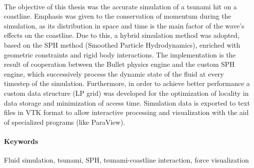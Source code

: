 \paragraph{} The objective of this thesis was the accurate simulation of a tsunami hit on
a coastline. Emphasis was given to the conservation of momentum during the simulation, as
its distribution in space and time is the main factor of the wave's effects on the
coastline. Due to this, a hybrid simulation method was adopted, based on the SPH method
(Smoothed Particle Hydrodynamics), enriched with geometric constraints and rigid body
interactions. The implementation is the result of cooperation between the Bullet physics
engine and the custom SPH engine, which successively process the dynamic state of the
fluid at every timestep of the simulation. Furthermore, in order to achieve better
performance a custom data structure (LP grid) was developed for the optimization of
locality in data storage and minimization of access time. Simulation data is exported to
text files in VTK format to allow interactive processing and visualization with the aid of
specialized programs (like ParaView).
\paragraph{Keywords} Fluid simulation, tsunami, SPH, tsunami-coastline interaction,
force visualization

